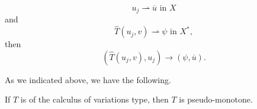 \begin{Definition}
\begin{enumerate}[label=CV-\arabic*.,ref=CV-\arabic*]
\begin{equation}
u_j\rightharpoonup\overline u\text{ in }X
\end{equation}
and
\begin{equation}\label{eq:calculus-variations-type-cv-four-weak-image}
\widehat T(u_j,v)\rightharpoonup\psi\text{ in }X^*,
\end{equation}
then
\begin{equation}\label{eq:calculus-variations-type-cv-four-pairing-convergence}
(\widehat T(u_j,v),u_j)\to(\psi,\overline u).
\end{equation}
\end{enumerate}
\end{Definition}

As we indicated above, we have the following.

\begin{Theorem}
\label{thm:cv-type-implies-pseudo-monotonicity}
If $T$ is of the calculus of variations type, then $T$ is pseudo-monotone.
\end{Theorem}

